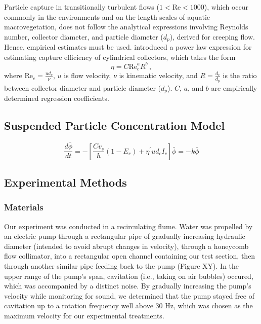 \documentclass[10pt,a4paper]{article}
\newcommand\Rey{\mathrm{Re}}
\begin{document}
Particle capture in transitionally turbulent flows (\(1<\Rey<1000\)), which occur commonly in the environments and on the length scales of aquatic macrovegetation, does not follow the analytical expressions involving Reynolds number, collector diameter, and particle diameter (\(d_p\)), derived for creeping flow. Hence, empirical estimates must be used. \citet{Palmer_2004} introduced a power law expression for estimating capture efficiency of cylindrical collectors, which takes the form \[\eta=C\Rey_c^{a}R^{b}\,,\] where \(\Rey_c=\frac{ud_c}{\nu}\), \(u\) is flow velocity, \(\nu\) is kinematic velocity, and \(R=\frac{d_c}{d_p}\) is the ratio between collector diameter and particle diameter (\(d_p\)). \(C\), \(a\), and \(b\) are empirically determined regression coefficients.

\subsection{Suspended Particle Concentration Model}

\[\frac{d\bar{\phi}}{dt} = -[\frac{Cv_s}{h}(1-E_r) + \eta^{\prime}ud_cI_c]\bar{\phi} = -k\bar{\phi}\]

\subsection{Experimental Methods}

\subsubsection{Materials}

Our experiment was conducted in a recirculating flume. Water was propelled by an electric pump through a rectangular pipe of gradually increasing hydraulic diameter (intended to avoid abrupt changes in velocity), through a honeycomb flow collimator, into a rectangular open channel containing our test section, then through another similar pipe feeding back to the pump (Figure XY). In the upper range of the pump's span, cavitation (i.e., taking on air bubbles) occured, which was accompanied by a distinct noise. By gradually increasing the pump's velocity while monitoring for sound, we determined that the pump stayed free of cavitation up to a rotation frequency well above 30 Hz, which was chosen as the maximum velocity for our experimental treatments. 
\end{document}
